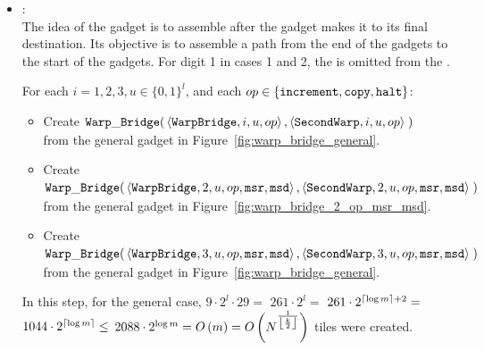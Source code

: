 \begin{itemize}
    \item {\warpbridge}:\\
    The idea of the {\warpbridge} gadget is to assemble after the {\firstwarp} gadget makes it to its final destination.
    Its objective is to assemble a path from the end of the {\firstwarp} gadgets to the start of the {\secondwarp} gadgets.
    For digit 1 in cases 1 and 2, the {\warpbridge} is omitted from the {\warpunit}.

    For each $i = 1,2,3, u \in \{0, 1\}^l$, and each $\inc \in \ops$:
    \begin{itemize}

        \item Create
        $\begin{aligned}[t]
            \warpbridge(& \left\langle {\tt WarpBridge}, i, u, \inc \right\rangle,
                          \left\langle {\tt SecondWarp}, i, u, \inc \right\rangle \;)
        \end{aligned}$ \\ from the general gadget in Figure~\ref{fig:warp_bridge_general}.
        \vspace{.5cm}

        \item Create
        $\begin{aligned}[t]
            \warpbridge(& \left\langle {\tt WarpBridge}, 2, u, \inc, {\tt msr}, {\tt msd} \right\rangle,
                          \left\langle {\tt SecondWarp}, 2, u, \inc, {\tt msr}, {\tt msd} \right\rangle \;)
        \end{aligned}$ \\ from the general gadget in Figure~\ref{fig:warp_bridge_2_op_msr_msd}.
        \vspace{.5cm}

        \item Create
        $\begin{aligned}[t]
            \warpbridge(& \left\langle {\tt WarpBridge}, 3, u, \inc, {\tt msr}, {\tt msd} \right\rangle,
                          \left\langle {\tt SecondWarp}, 3, u, \inc, {\tt msr}, {\tt msd} \right\rangle \;)
        \end{aligned}$ \\ from the general gadget in Figure~\ref{fig:warp_bridge_general}.
        \vspace{.5cm}
    \end{itemize}

    In this step, for the general case,
    $9 \cdot 2^l \cdot 29 =$
    $261 \cdot 2^l =$
    $261 \cdot 2^{\ceil*{{\log m}} + 2} =$
    $1044 \cdot 2^{\ceil*{\log m}} \leq$
    $2088 \cdot 2^{\log m} = \bigom$ tiles were created.


\end{itemize}
